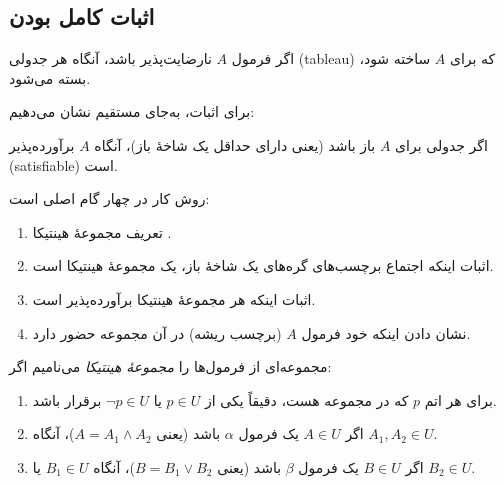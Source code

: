 \subsection*{ اثبات کامل بودن }
  
  \begin{theorem}
    اگر فرمول \(A\) نارضایت‌پذیر باشد، آنگاه هر جدولی (tableau) که برای \(A\) ساخته شود، بسته می‌شود.
  \end{theorem}
  
  برای اثبات، به‌جای مستقیم نشان می‌دهیم:
  
  \begin{corollary}
    اگر جدولی برای \(A\) باز باشد (یعنی دارای حداقل یک شاخهٔ باز)، آنگاه \(A\) برآورده‌پذیر (satisfiable) است.
  \end{corollary}
  
  روش کار در چهار گام اصلی است:
  \begin{enumerate}[1)]
    \item تعریف مجموعهٔ هینتیکا .
    \item اثبات اینکه اجتماع برچسب‌های گره‌های یک شاخهٔ باز، یک مجموعهٔ هینتیکا است.
    \item اثبات اینکه هر مجموعهٔ هینتیکا برآورده‌پذیر است.
    \item نشان دادن اینکه خود فرمول \(A\) (برچسب ریشه) در آن مجموعه حضور دارد.
  \end{enumerate}
  
  \begin{definition}\label{def:2.75}
  مجموعه‌ای از فرمول‌ها را \emph{مجموعهٔ هینتیکا} می‌نامیم اگر:
  \begin{enumerate}[1)]
    \item برای هر اتم \(p\) که در مجموعه هست، دقیقاً یکی از \(p\in U\) یا \(\neg p\in U\) برقرار باشد.
    \item اگر \(A\in U\) یک فرمول \(\alpha\) باشد (یعنی \(A=A_1\land A_2\))، آنگاه \(A_1, A_2\in U\).
    \item اگر \(B\in U\) یک فرمول \(\beta\) باشد (یعنی \(B=B_1\lor B_2\))، آنگاه \(B_1\in U\) یا \(B_2\in U\).
  \end{enumerate}
  \end{definition}
  

